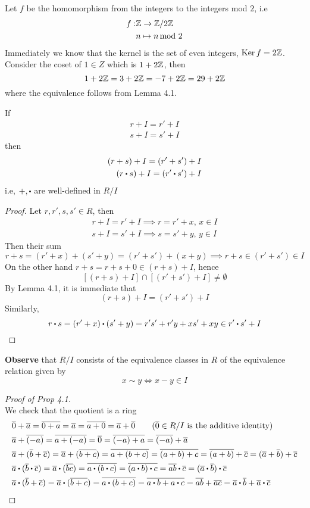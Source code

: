 \documentclass[../Main.tex]{subfiles}
\begin{document}
\begin{example}
	Let $f$ be the homomorphism from the integers to the integers mod $2$, i.e
	\begin{align*}
		f:&\mathbb{Z} \to \mathbb{Z}/2\mathbb{Z} \\
		&n\mapsto n\,\text{mod }2 
	\end{align*}
	Immediately we know that the kernel is the set of even integers, $\operatorname{Ker} f = 2\mathbb{Z}$.\\
	Consider the coset of $1\in Z$ which is $1+2\mathbb{Z}$, then
	\[1+2\mathbb{Z} = 3+2\mathbb{Z} = -7+2\mathbb{Z} = 29+2\mathbb{Z}\]
	where the equivalence follows from Lemma 4.1.
\end{example}
\begin{lem}
	If
	\begin{align*}
		r+I = r'+I\\
		s+I = s'+I
	\end{align*}
	then
	\begin{align*}
		(r+s)+I = (r'+s')+I\\
		(r\rdot s)+I = (r'\rdot s')+I
	\end{align*}
	i.e, $+,\rdot $ are well-defined in $R/I$
\end{lem}
\begin{proof}
	Let $r,r',s,s' \in R$, then
	\begin{align*}
		r+I=r'+I \implies r=r'+x,\, x\in I\\
		s+I=s'+I \implies s=s'+y,\, y\in I
	\end{align*}
	Then their sum
	\[r+s=(r'+x)+(s'+y)=(r'+s')+(x+y) \implies r+s\in (r'+s')\in I\]
	On the other hand $r+s=r+s+0 \in (r+s)+I$, hence
	\[[(r+s)+I]\cap [(r'+s')+I]\ne \emptyset \]
	By Lemma 4.1, it is immediate that
	\[(r+s)+I=(r'+s')+I\]
	Similarly,
	\[r\rdot s=(r'+x)\rdot (s'+y)=r's'+r'y+xs'+xy \in r'\rdot s'+I\]
\end{proof}
\newpage
\textbf{Observe} that	$R/I$ consists of the equivalence classes in $R$ of the equivalence relation given by
	\[x\sim y \Longleftrightarrow x-y \in I\]
\begin{proof}[Proof of Prop 4.1]~\\
	We check that the quotient is a ring
	\begin{align*}
	&\obar{0}+\obar{a}=\obar{0+a}=\obar{a}=\obar{a+0}=\obar{a}+\obar{0} \qquad (\obar{0}\in R/I \text{ is the additive identity})\\
	&\obar{a}+\obar{(-a)}=\obar{a+(-a)} =\obar{0} = \obar{(-a)+a}=\obar{(-a)}+\obar{a}\\
	&\obar{a}+(\obar{b}+\obar{c}) = \obar{a}+(\obar{b+c}) = \obar{a+(b+c)} = \obar{(a+b)+c} = \obar{(a+b)}+\obar{c}=(\obar{a}+\obar{b})+\obar{c}\\
	&\obar{a}\rdot (\obar{b}\rdot \obar{c})=\obar{a}\rdot (\obar{bc})=\obar{a\rdot (b\rdot c)}=\obar{(a\rdot b)\rdot c} = \obar{ab}\rdot \obar{c}=(\obar{a}\rdot \obar{b})\rdot \obar{c}\\
	&\obar{a}\rdot (\obar{b}+\obar{c})=\obar{a}\rdot (\obar{b+c})=\obar{a\rdot (b+c)}=\obar{a\rdot b+a\rdot c}=\obar{ab}+\obar{ac}=\obar{a}\rdot \obar{b}+\obar{a}\rdot \obar{c}
	\end{align*}
\end{proof}
\end{document}
